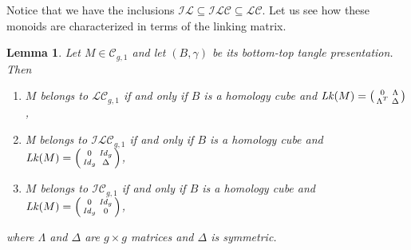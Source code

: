 \documentclass[10pt]{amsart}
\numberwithin{equation}{section}
\numberwithin{equation}{section}
\newtheorem{lemma}[theorem]{Lemma}
\theoremstyle{definition}
\begin{document}
Notice that we have the inclusions $\mathcal{IL}\subseteq\mathcal{ILC}\subseteq\mathcal{LC}$. Let us see how these monoids are characterized in terms of the linking matrix.

\begin{lemma}\label{lemmalinking} Let $M\in\mathcal{C}_{g,1}$ and let $(B,\gamma)$ be its bottom-top tangle presentation. Then
\begin{enumerate}
\item[\emph{(\emph{i})}] $M$ belongs to $\mathcal{LC}_{g,1}$ if and only if $B$ is a homology cube and $\text{\emph{Lk}}(M)=\left( \begin{smallmatrix} 0 & \Lambda \\ {\Lambda}^{T} & \Delta \end{smallmatrix} \right)$, 

\medskip

\item[\emph{(\emph{ii})}] M belongs to $\mathcal{ILC}_{g,1}$ if and only if $B$ is a  homology cube and   $\text{\emph{Lk}}(M)=\left( \begin{smallmatrix} 0 & {\text{\emph{Id}}_g}\\ {\text{\emph{Id}}_g} & {\Delta} \end{smallmatrix} \right)$,

\medskip

\item[\emph{(\emph{iii})}] $M$ belongs to $\mathcal{IC}_{g,1}$ if and only if $B$ is a homology cube and   $\text{\emph{Lk}}(M)=\left( \begin{smallmatrix} 0 & {\text{\emph{Id}}_g}\\ {\text{\emph{Id}}_g} & 0 \end{smallmatrix} \right)$,
\end{enumerate}
where  $\Lambda$ and $\Delta$ are $g\times g$ matrices and $\Delta$ is symmetric.
\end{lemma}
\end{document}
